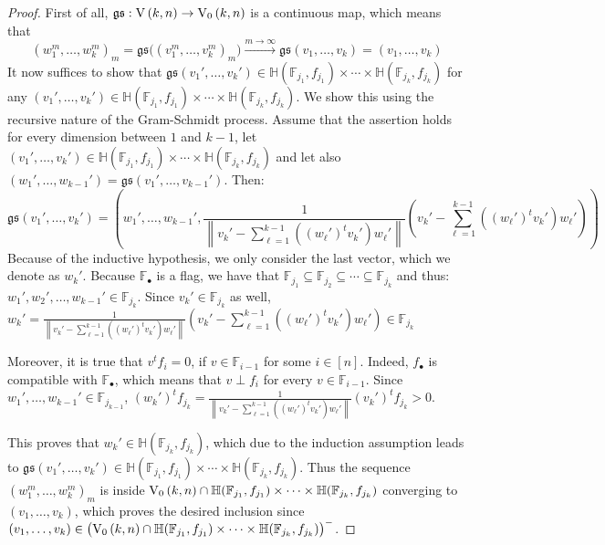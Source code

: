 \begin{proof}
First of all, $\mathfrak{gs}:\St{k}{n}\to\StO{k}{n}$ is a continuous map, which means that
\[{(w_1^m,\ldots,w_k^m)}_m=\mathfrak{gs}\big({(v_1^m,\ldots,v_k^m)}_m\big)\overset{m\to\infty}{\to}\mathfrak{gs}(v_1,\ldots,v_k)=(v_1,\ldots,v_k)\]
It now suffices to show that $\mathfrak{gs}(v_1',\ldots,v_k')\in\mathbb{H}(\mathbb{F}_{j_1},f_{j_1})\times\cdots\times\mathbb{H}(\mathbb{F}_{j_k},f_{j_k})$ for any $(v_1',\ldots,v_k')\in\mathbb{H}(\mathbb{F}_{j_1},f_{j_1})\times\cdots\times\mathbb{H}(\mathbb{F}_{j_k},f_{j_k})$. We show this using the recursive nature of the Gram-Schmidt process. Assume that the assertion holds for every dimension between $1$ and $k-1$, let $(v_1',\ldots,v_k')\in\mathbb{H}(\mathbb{F}_{j_1},f_{j_1})\times\cdots\times\mathbb{H}(\mathbb{F}_{j_k},f_{j_k})$ and let also $(w_1',\ldots,w_{k-1}')=\mathfrak{gs}(v_1',\ldots,v_{k-1}')$. Then:
\[\mathfrak{gs}(v_1',\ldots,v_k')=\left(w_1',\ldots,w_{k-1}',\frac{1}{\left\|v_k'-\sum_{\ell=1}^{k-1}((w_{\ell}')^t v_k')w_{\ell}'\right\|}\left(v_k'-\sum_{\ell=1}^{k-1}((w_{\ell}')^tv_k')w_{\ell}'\right)\right)\]
Because of the inductive hypothesis, we only consider the last vector, which we denote as $w_k'$. Because $\mathbb{F}_{\bullet}$ is a flag, we have that $\mathbb{F}_{j_1}\subseteq\mathbb{F}_{j_2}\subseteq\cdots\subseteq\mathbb{F}_{j_k}$ and thus: $w_1',w_2',\ldots,w_{k-1}'\in\mathbb{F}_{j_k}$. Since $v_k'\in\mathbb{F}_{j_k}$ as well,
$w_k'=\frac{1}{\left\|v_k'-\sum_{\ell=1}^{k-1}((w_{\ell}')^tv_k')w_{\ell}'\right\|}\left(v_k'-\sum_{\ell=1}^{k-1}((w_{\ell}')^t v_k')w_{\ell}'\right)\in\mathbb{F}_{j_k}$

Moreover, it is true that $v^tf_i=0$, if $v\in\mathbb{F}_{i-1}$ for some $i\in[n]$. Indeed, $f_{\bullet}$ is compatible with $\mathbb{F}_{\bullet}$, which means that $v\perp f_i$ for every $v\in\mathbb{F}_{i-1}$. Since $w_1',\ldots,w_{k-1}'\in\mathbb{F}_{j_{k-1}}$,
$(w_k')^tf_{j_k}=\frac{1}{\left\|v_k'-\sum_{\ell=1}^{k-1}((w_{\ell}')^tv_k')w_{\ell}'\right\|}(v_k')^tf_{j_k}>0$.

This proves that $w_k'\in\mathbb{H}(\mathbb{F}_{j_k},f_{j_k})$, which due to the induction assumption leads to
$\mathfrak{gs}(v_1',\ldots,v_k')\in\mathbb{H}(\mathbb{F}_{j_1},f_{j_1})\times\cdots\times\mathbb{H}(\mathbb{F}_{j_k},f_{j_k})$.
Thus the sequence ${(w_1^m,\ldots,w_k^m)}_m$ is inside $\StO{k}{n}\cap\mathbb{H}(\mathbb{F}_{j_1},f_{j_1})\times\cdots\times\mathbb{H}(\mathbb{F}_{j_k},f_{j_k})$ converging to $(v_1,\ldots,v_k)$, which proves the desired inclusion since
$(v_1,\ldots,v_k)\in{\big(\StO{k}{n}\cap\mathbb{H}(\mathbb{F}_{j_1},f_{j_1})\times\cdots\times\mathbb{H}(\mathbb{F}_{j_k},f_{j_k})\big)}^-$.
\end{proof}
